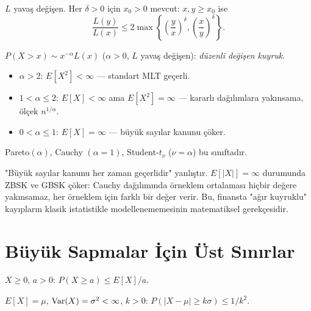 \begin{teorem}\label{thm:potter}
$L$ yavaş değişen. Her $\delta>0$ için $x_0>0$ mevcut:
$x,y\geq x_0$ ise
\[
  \frac{L(y)}{L(x)} \leq 2\max\!\left\{\left(\frac{y}{x}\right)^\delta, \left(\frac{x}{y}\right)^\delta\right\}.
\]
\end{teorem}

\begin{ornek}\label{ex:agir_kuyruk}
$P(X>x)\sim x^{-\alpha}L(x)$ ($\alpha>0$, $L$ yavaş değişen): \emph{düzenli değişen kuyruk}.
\begin{itemize}
  \item $\alpha>2$: $E[X^2]<\infty$ --- standart MLT geçerli.
  \item $1<\alpha\leq2$: $E[X]<\infty$ ama $E[X^2]=\infty$ --- kararlı dağılımlara yakınsama, ölçek $n^{1/\alpha}$.
  \item $0<\alpha\leq1$: $E[X]=\infty$ --- büyük sayılar kanunu çöker.
\end{itemize}
Pareto$(\alpha)$, Cauchy $(\alpha=1)$, Student-$t_\nu$ ($\nu=\alpha$) bu sınıftadır.
\end{ornek}

\begin{hataanalizi}
"Büyük sayılar kanunu her zaman geçerlidir" yanlıştır. $E[|X|]=\infty$ durumunda ZBSK ve GBSK çöker: Cauchy dağılımında örneklem ortalaması hiçbir değere yakınsamaz, her örneklem için farklı bir değer verir. Bu, finansta "ağır kuyruklu" kayıpların klasik istatistikle modellenememesinin matematiksel gerekçesidir.
\end{hataanalizi}

\section{Büyük Sapmalar İçin Üst Sınırlar}
\label{sec:buyuk_sapma_sinir}

\begin{teorem}\label{thm:markov_hatirlatma}
$X\geq0$, $a>0$: $P(X\geq a)\leq E[X]/a$.
\end{teorem}

\begin{teorem}\label{thm:chebyshev_hatirlatma}
$E[X]=\mu$, $\operatorname{Var}(X)=\sigma^2<\infty$, $k>0$:
$P(|X-\mu|\geq k\sigma)\leq 1/k^2$.
\end{teorem}

